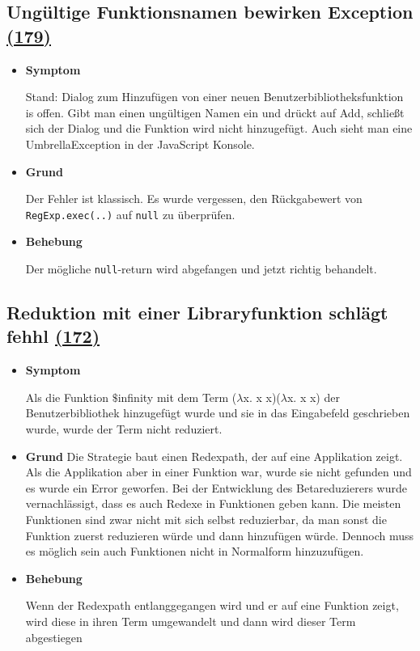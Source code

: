\documentclass[parskip=full,11pt,twoside]{scrartcl}
\newcommand{\issueref}[1]{
    \href{https://git.scc.kit.edu/ap/Aurora/issues/#1}{(#1)}
}
\newcommand{\regrtest}[5]{
    \subsection{#1 \issueref{#2}}
    \begin{itemize}
        \item \textbf{Symptom}
            #3
        \item \textbf{Grund}
            #4
        \item \textbf{Behebung}
            #5
    \end{itemize}
}
\begin{document}
    \regrtest{Ungültige Funktionsnamen bewirken Exception}{179}{
        Stand: Dialog zum Hinzufügen von einer neuen Benutzerbibliotheksfunktion is offen.
        Gibt man einen ungültigen Namen ein und drückt auf Add, schließt sich der Dialog und die Funktion wird nicht
        hinzugefügt. Auch sieht man eine UmbrellaException in der JavaScript Konsole.
    }{
        Der Fehler ist klassisch. Es wurde vergessen, den Rückgabewert von \texttt{RegExp.exec(..)} auf \texttt{null} zu überprüfen.
    }{
        Der mögliche \texttt{null}-return wird abgefangen und jetzt richtig behandelt.
  }


	\regrtest{Reduktion mit einer Libraryfunktion schlägt fehhl}{172}{
		Als die Funktion $\$$infinity mit dem Term ($\lambda$x. x x)($\lambda$x. x x) der
		Benutzerbibliothek hinzugefügt wurde und sie in
		das Eingabefeld geschrieben wurde, wurde der Term nicht reduziert.
	}{ Die Strategie baut einen Redexpath, der auf eine Applikation zeigt. Als die Applikation aber in einer
	Funktion war, wurde sie nicht gefunden und es wurde ein Error geworfen. Bei der Entwicklung des Betareduzierers
	wurde vernachlässigt, dass es auch Redexe in Funktionen geben kann. Die meisten Funktionen sind zwar nicht
	mit sich selbst	reduzierbar, da man sonst die Funktion zuerst reduzieren würde und dann hinzufügen würde.
	Dennoch muss es möglich sein auch Funktionen nicht in Normalform hinzuzufügen.
}{
  Wenn der Redexpath entlanggegangen wird und er auf eine Funktion zeigt, wird diese in ihren Term umgewandelt und
  dann wird dieser Term abgestiegen
}
\end{document}
